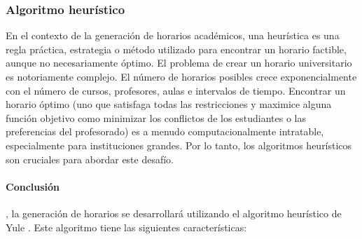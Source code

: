 \subsubsection{Algoritmo heurístico}

En el contexto de la generación de horarios académicos, una heurística es una regla práctica, estrategia o método utilizado para encontrar un horario factible, aunque no necesariamente óptimo.
El problema de crear un horario universitario es notoriamente complejo.
El número de horarios posibles crece exponencialmente con el número de cursos, profesores, aulas e intervalos de tiempo.
Encontrar un horario óptimo (uno que satisfaga todas las restricciones y maximice alguna función objetivo como minimizar los conflictos de los estudiantes o las preferencias del profesorado) es a menudo computacionalmente intratable, especialmente para instituciones grandes.
Por lo tanto, los algoritmos heurísticos son cruciales para abordar este desafío.

\paragraph{Conclusión}
, la generación de horarios se desarrollará utilizando el algoritmo heurístico de Yule \cite{Yule1969}. Este algoritmo tiene las siguientes características:

